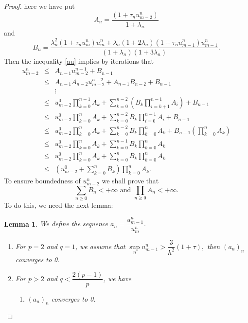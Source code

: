 \documentclass[a4paper,12pt,english,reqno]{smfart}
\newtheorem{lem}[th1]{ Lemma}
\begin{document}
\begin{proof}
		here we have put
		\begin{equation*}
		A_{n}=\frac{\left(1+\tau_{n}u_{m-2}^{n}\right)}{1+\lambda_{n}}
		\end{equation*}
		and 
		\begin{equation*}
		B_{n}=\frac{\lambda_{n}^{2}(1+\tau_{n}u_{m}^{n})u_{m}^{n}+\lambda_{n}(1+2\lambda_{n})(1+\tau_{n}u_{m-1}^{n})u_{m-1}^{n}}{(1+\lambda_{n})(1+3\lambda_{n})}.
		\end{equation*}
		Then the inequality \eqref{au}
		implies by iterations that
		\begin{eqnarray*}
			u_{m-2}^{n}&\leq & A_{n-1}u_{m-2}^{n-1}+B_{n-1}\\
			&\leq& A_{n-1}A_{n-2}u_{m-2}^{n-2}+A_{n-1}B_{n-2}+B_{n-1}\\
			&&\vdots\\
			&\leq& u_{m-2}^{0}\prod_{k=0}^{n-1}{A_{k}}+\sum_{k=0}^{n-2}\left({B_{k}}\prod_{i=k+1}^{n-1}{A_{i}}\right)+B_{n-1} \\
			&\leq& u_{m-2}^{0}\prod_{k=0}^{n}{A_{k}}+\sum_{k=0}^{n-2}{ B_{k}}\prod_{i=0}^{n-1}{A_{i}}+B_{n-1}\\
			&\leq& u_{m-2}^{0}\prod_{k=0}^{n}{A_{k}}+\sum_{k=0}^{n-2}{ B_{k}}\prod_{k=0}^{n}{A_{k}}+B_{n-1}\left(\prod_{k=0}^{n}{A_{k}}\right)\\
			&\leq& u_{m-2}^{0}\prod_{k=0}^{n}{A_{k}}+\sum_{k=0}^{n-1}{ B_{k}}\prod_{k=0}^{n}{A_{k}}\\
			&\leq& u_{m-2}^{0}\prod_{k=0}^{n}{A_{k}}+\sum_{k=0}^{n}{ B_{k}}\prod_{k=0}^{n}{A_{k}}\\
			&\leq& \left(u_{m-2}^{0}+\sum_{k=0}^{n}{ B_{k}}\right)\prod_{k=0}^{n}{A_{k}}.
		\end{eqnarray*}
		To ensure boundedness of $u_{m-2}^{n}$ we shall prove that 
		\begin{equation*}
		\sum_{n\geq 0}{ B_{n}}<+\infty \text{ and } \prod_{n\geq0}{A_{n}}<+\infty.
		\end{equation*}
		To do this, we need the next lemma:
		\begin{lem}
			We define the sequence $a_{n}=\dfrac{u_{m-1}^{n}}{u_{m}^{n}}.$
			\begin{enumerate}
				\item For $p=2$ and $q=1$, we assume that $\sup\limits_{n}u_{m-1}^{n}>\dfrac{3}{h^{2}}(1+\tau),$ then $(a_{n})_{n}$ converges to 0.
				\item For $p>2$ and $q<\dfrac{2(p-1)}{p}$, we have
				\begin{enumerate}
					\item $(a_{n})_{n}$ converges to 0.

\end{enumerate}
\end{enumerate}
\end{lem}
\end{proof}
\end{document}
